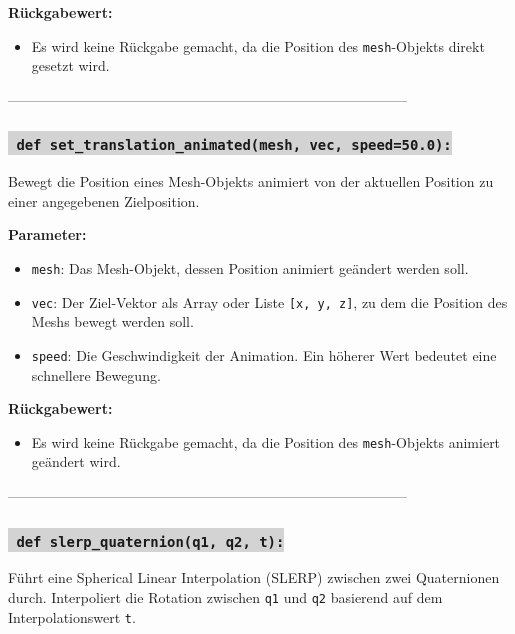 \noindent \textbf{Rückgabewert:} \vspace{-6ex} \\
\begin{itemize}
    \setlength{\itemindent}{1em}
    \item Es wird keine Rückgabe gemacht, da die Position des \texttt{mesh}-Objekts direkt gesetzt wird.
\end{itemize}

--------------------------------------------------------------------------------------

\subsubsection*{\colorbox{lightgray}{\texttt{\textbf{\color{green} def} \color{blue} set\_translation\_animated}\textbf{\texttt{(mesh, vec, speed=50.0):}}}}
Bewegt die Position eines Mesh-Objekts animiert von der aktuellen Position zu einer angegebenen Zielposition.

\noindent \textbf{Parameter:} \vspace{-6ex} \\
\begin{itemize}
    \setlength{\itemindent}{1em}
    \item \texttt{mesh}: Das Mesh-Objekt, dessen Position animiert geändert werden soll.
    \item \texttt{vec}: Der Ziel-Vektor als Array oder Liste \texttt{[x, y, z]}, zu dem die Position des Meshs bewegt werden soll.
    \item \texttt{speed}: Die Geschwindigkeit der Animation. Ein höherer Wert bedeutet eine schnellere Bewegung.
\end{itemize}

\noindent \textbf{Rückgabewert:} \vspace{-6ex} \\
\begin{itemize}
    \setlength{\itemindent}{1em}
    \item Es wird keine Rückgabe gemacht, da die Position des \texttt{mesh}-Objekts animiert geändert wird.
\end{itemize}

--------------------------------------------------------------------------------------





\subsubsection*{\colorbox{lightgray}{\texttt{\textbf{\color{green} def} \color{blue} slerp\_quaternion}\textbf{\texttt{(q1, q2, t):}}}}
Führt eine Spherical Linear Interpolation (SLERP) zwischen zwei Quaternionen durch. Interpoliert die Rotation zwischen \texttt{q1} und \texttt{q2} basierend auf dem Interpolationswert \texttt{t}.

